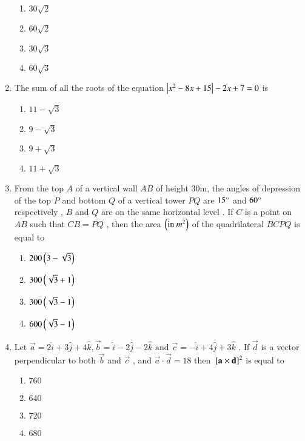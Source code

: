 \documentclass[journal,12pt,onecolumn]{IEEEtran}
\theoremstyle{remark}
\begin{document}
\begin{enumerate}
    \begin{multicols}{2}
        \begin{enumerate}
            \item $30 \sqrt{2}$
            \item $60 \sqrt{2}$\\
            \item $30 \sqrt{3}$
            \item $60 \sqrt{3}$
        \end{enumerate}
    \end{multicols}
    \item The sum of all the roots of the equation $\left\vert x^2 - 8x + 15\right\vert - 2x +7 = 0$ is
    \begin{multicols}{2}
        \begin{enumerate}
            \item $11 - \sqrt{3}$
            \item $9 - \sqrt{3}$
            \item $9 + \sqrt{3}$
            \item $11 + \sqrt{3}$
        \end{enumerate}
    \end{multicols}
    \item From the top $A$ of a vertical wall $AB$ of height $30\text{m}$, the angles of depression of the top $P$ and bottom $Q$ of a vertical tower $PQ$ are $15\degree$ and $60\degree$ respectively , $B$ and $Q$ are on the same horizontal level . If $C$ is a point on $AB$ such that $ CB = PQ $ , then the area $\left(\text{in } m^2\right)$ of the quadrilateral $BCPQ$ is equal to
    \begin{multicols}{2}
        \begin{enumerate}
            \item $200\left(3-\sqrt{3}\right)$
            \item $300\left(\sqrt{3}+1\right)$\\
            \item $300\left(\sqrt{3}-1\right)$
            \item $600\left(\sqrt{3}-1\right)$
        \end{enumerate}
    \end{multicols}
    \item Let $\vec{a} = 2\hat{i}+3\hat{j}+4\hat{k} , \vec{b} = \hat{i} - 2\hat{j} - 2\hat{k} \text{ and } \vec{c} = -\hat{i} + 4\hat{j} + 3\hat{k}$ . If $\vec{d}$ is a vector perpendicular to both $\vec{b}$ and $\vec{c}$ , and $\vec{a}\cdot \vec{d} = 18$ then ${}\left[\mathbf{a}\times\mathbf{d}\right]^2$ is equal to
    \begin{multicols}{2}
        \begin{enumerate}
            \item $760$
            \item $640$
            \item $720$
            \item $680$
        \end{enumerate}
    \end{multicols}
\end{enumerate}
\end{document}
